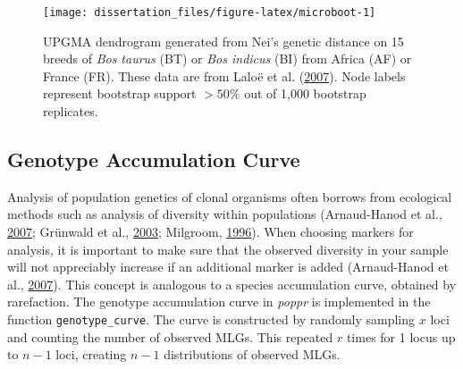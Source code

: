 \documentclass[double,12pt]{beavtex}
\begin{document}
  \begin{Shaded}
  \begin{Highlighting}[]
  \NormalTok{(}\NormalTok{);}
  \NormalTok{(}\NormalTok{, } \NormalTok{);}
  \StringTok{ }\NormalTok{(}
  \StringTok{ }\ErrorTok{~}
  \StringTok{ }
  
  \NormalTok{(}\NormalTok{);}
  \StringTok{ } \NormalTok{, } \NormalTok{);}
  \end{Highlighting}
  \end{Shaded}
  
  \begin{figure}
  
  {\centering \texttt{[image: dissertation\_files/figure-latex/microboot-1]} 
  
  }
  
  \caption[UPGMA dendrogram generated from Nei's genetic distance]{UPGMA dendrogram generated from Nei's genetic distance on 15 breeds of
  \emph{Bos taurus} (BT) or \emph{Bos indicus} (BI) from Africa (AF) or
  France (FR). These data are from Laloë et al.
  (\protect\hyperlink{ref-laloe2007consensus}{2007}). Node labels
  represent bootstrap support \(>50\%\) out of 1,000 bootstrap replicates.}\label{fig:microboot}
  \end{figure}
  
  \subsection{Genotype Accumulation
  Curve}\label{genotype-accumulation-curve}
  
  Analysis of population genetics of clonal organisms often borrows from
  ecological methods such as analysis of diversity within populations
  (Arnaud-Hanod et al.,
  \protect\hyperlink{ref-arnaud2007standardizing}{2007}; Grünwald et al.,
  \protect\hyperlink{ref-grunwald2003analysis}{2003}; Milgroom,
  \protect\hyperlink{ref-milgroom1996recombination}{1996}). When choosing
  markers for analysis, it is important to make sure that the observed
  diversity in your sample will not appreciably increase if an additional
  marker is added (Arnaud-Hanod et al.,
  \protect\hyperlink{ref-arnaud2007standardizing}{2007}). This concept is
  analogous to a species accumulation curve, obtained by rarefaction. The
  genotype accumulation curve in \emph{poppr} is implemented in the
  function \texttt{genotype\_curve}. The curve is constructed by randomly
  sampling \(x\) loci and counting the number of observed MLGs. This
  repeated \(r\) times for 1 locus up to \(n-1\) loci, creating \(n-1\)
  distributions of observed MLGs.
  
\end{document}
